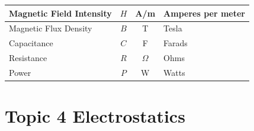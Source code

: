 \documentclass{book}
\begin{document}
\begin{table}
\begin{tabular}{lccl}
		Magnetic Field Intensity    & $H$             & A/m                     & Amperes per meter \\ \midrule
		Magnetic Flux Density       & $B$             & T                       & Tesla             \\ \midrule
		Capacitance                 & $C$             & F                       & Farads            \\ \midrule
		Resistance                  & $R$             & $\Omega$                & Ohms              \\ \midrule
		Power                       & $P$             & W                       & Watts             \\ \bottomrule
	\end{tabular}
\end{table}

\pagebreak

\chapter*{Topic 4 Electrostatics}
\end{document}
